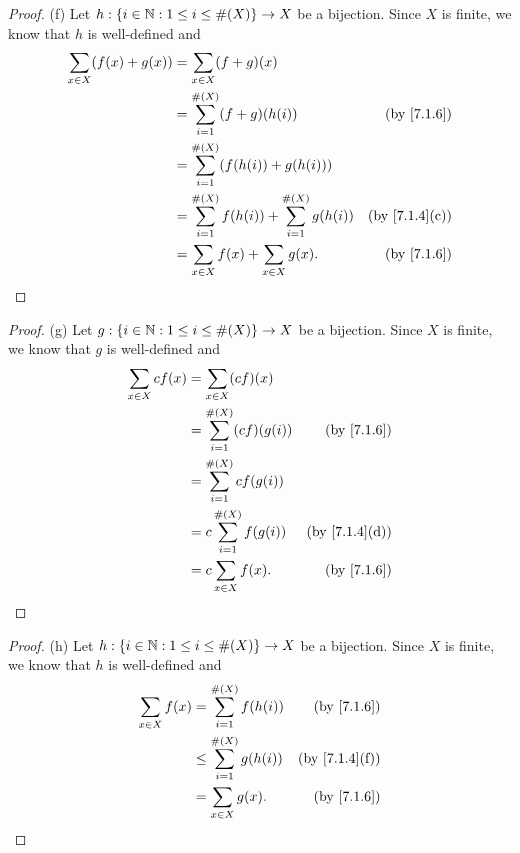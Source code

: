 \begin{proof}{(f)}
  Let \(h : \{i \in \mathbb{N} : 1 \leq i \leq \#(X)\} \to X\) be a bijection.
  Since \(X\) is finite, we know that \(h\) is well-defined and
  \begin{align*}
    \sum_{x \in X} (f(x) + g(x)) & = \sum_{x \in X} (f + g)(x)                                                                 \\
                                 & = \sum_{i = 1}^{\#(X)} (f + g)(h(i))                          & \text{(by \cref{7.1.6})}    \\
                                 & = \sum_{i = 1}^{\#(X)} (f(h(i)) + g(h(i)))                                                  \\
                                 & = \sum_{i = 1}^{\#(X)} f(h(i)) + \sum_{i = 1}^{\#(X)} g(h(i)) & \text{(by \cref{7.1.4}(c))} \\
                                 & = \sum_{x \in X} f(x) + \sum_{x \in X} g(x).                  & \text{(by \cref{7.1.6})}
  \end{align*}
\end{proof}

\begin{proof}{(g)}
  Let \(g : \{i \in \mathbb{N} : 1 \leq i \leq \#(X)\} \to X\) be a bijection.
  Since \(X\) is finite, we know that \(g\) is well-defined and
  \begin{align*}
    \sum_{x \in X} cf(x) & = \sum_{x \in X} (cf)(x)                                        \\
                         & = \sum_{i = 1}^{\#(X)} (cf)(g(i)) & \text{(by \cref{7.1.6})}    \\
                         & = \sum_{i = 1}^{\#(X)} cf(g(i))                                 \\
                         & = c \sum_{i = 1}^{\#(X)} f(g(i))  & \text{(by \cref{7.1.4}(d))} \\
                         & = c \sum_{x \in X} f(x).          & \text{(by \cref{7.1.6})}
  \end{align*}
\end{proof}

\begin{proof}{(h)}
  Let \(h : \{i \in \mathbb{N} : 1 \leq i \leq \#(X)\} \to X\) be a bijection.
  Since \(X\) is finite, we know that \(h\) is well-defined and
  \begin{align*}
    \sum_{x \in X} f(x) & = \sum_{i = 1}^{\#(X)} f(h(i))    & \text{(by \cref{7.1.6})}    \\
                        & \leq \sum_{i = 1}^{\#(X)} g(h(i)) & \text{(by \cref{7.1.4}(f))} \\
                        & = \sum_{x \in X} g(x).            & \text{(by \cref{7.1.6})}
  \end{align*}
\end{proof}

